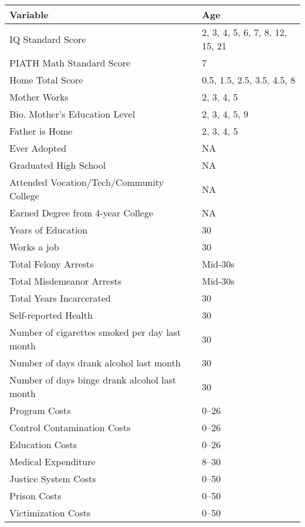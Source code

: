 \begin{tabular}{l l}
\hline\hline			
Variable	&	Age	\\
\hline			
IQ Standard Score	&	2, 3, 4, 5, 6, 7, 8, 12, 15, 21	\\
PIATH Math Standard Score	&	7	\\
Home Total Score	&	0.5, 1.5, 2.5, 3.5, 4.5, 8	\\
Mother Works	&	2, 3, 4, 5	\\
Bio. Mother's Education Level	&	2, 3, 4, 5, 9	\\
Father is Home	&	2, 3, 4, 5	\\
Ever Adopted	&		NA \\
Graduated High School	&	NA	\\
Attended Vocation/Tech/Community College	&	NA	\\
Earned Degree from 4-year College	&	NA	\\
Years of Education	&	30	\\
Works a job	&	30	\\
Total Felony Arrests	&	Mid-30s	\\
Total Misdemeanor Arrests	&	Mid-30s	\\
Total Years Incarcerated	&	30	\\
Self-reported Health	&	30	\\
Number of cigarettes smoked per day last month	&	30	\\
Number of days drank alcohol last month	&	30	\\
Number of days binge drank alcohol last month	&	30	\\
Program Costs	&	0--26	\\
Control Contamination Costs	&	0--26	\\
Education Costs	&	0--26	\\
Medical Expenditure &	8--30	\\
Justice System Costs	&	0--50	\\
Prison Costs	&	0--50	\\
Victimization Costs	&	0--50	\\
\hline\hline			
\end{tabular}